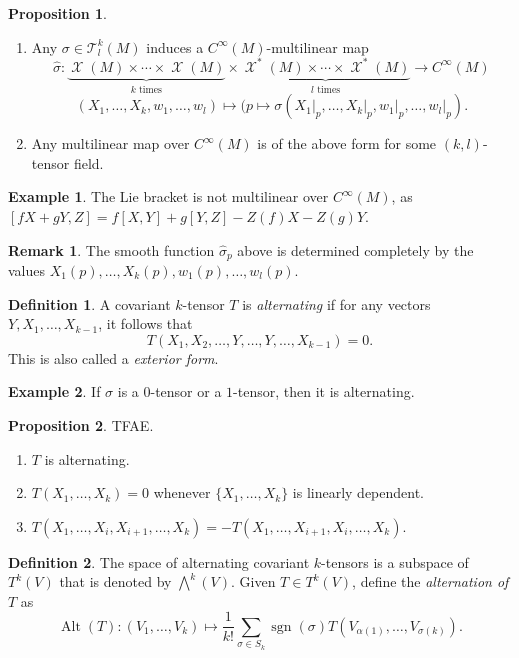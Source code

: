 \documentclass[10pt,letterpaper,cm]{nupset}
\theoremstyle{definition}
\newtheorem*{definition}{Definition}
\newtheorem{exmp}{Example}
\newtheorem{remark}{Remark}
\newtheorem{prop}{Proposition}
\newcommand{\T}{\mathcal T}
\newcommand{\1}{\mathbf{1}}
\newcommand{\0}{\vec 0}
\DeclareMathOperator{\Alt}{Alt}
\DeclareMathOperator{\sgn}{sgn}
\DeclareMathOperator{\vf}{\mathscr{X}}
\begin{document}
\begin{prop} $ $
\begin{enumerate}
\item Any $ \sigma \in \T_l^k(M)$ induces a $C^{\infty}(M)$-multilinear map $$\hat{\sigma} : \underbrace{\vf(M) \times \cdots \times \vf(M)}_{k \text{ times}} \times \underbrace{\vf^{\ast}(M) \times \cdots \times \vf^{\ast}(M)}_{l \text{ times}}\to C^{\infty}(M)$$  $$(X_1, \ldots, X_k, w_1, \ldots, w_l)\mapsto (p \mapsto \sigma (X_1\rvert_p, \ldots, X_k\rvert_p, w_1\rvert_p, \ldots, w_l\rvert_p).$$
\item Any multilinear map over $C^{\infty}(M)$ is of the above form for some $(k,l)$-tensor field.
\end{enumerate}
\end{prop}

\begin{exmp}
The Lie bracket is not multilinear over $C^{\infty}(M)$, as $[fX + gY, Z] = f[X, Y] + g[Y, Z]-Z(f)X -Z(g)Y$.
\end{exmp}

\begin{remark}
The smooth function $\hat{\sigma}_p$ above is determined completely by  the values $X_1(p), \ldots, X_k(p), w_1(p), \ldots, w_l(p)$.
\end{remark}

\begin{definition}
A covariant $k$-tensor $T$ is \textit{alternating}  if for any vectors $Y, X_1, \ldots, X_{k-1}$, it follows that $$T(X_1, X_2, \ldots, Y, \ldots, Y, \ldots, X_{k-1}) =0.$$ This is also called a \textit{exterior form}.
\end{definition}

\begin{exmp}
If $\sigma$ is a $0$-tensor or a $1$-tensor, then it is alternating.
\end{exmp}

\begin{prop} TFAE.
\begin{enumerate}
\item $T$ is alternating.
\item $T(X_1, \ldots, X_k) =0$ whenever $\{X_1, \ldots,  X_k\}$ is linearly dependent.
\item $T(X_1, \ldots, X_i, X_{i+1}, \ldots, X_k) = -T(X_1, \ldots, X_{i+1}, X_{i}, \ldots, X_k)$.
\end{enumerate}
\end{prop}

\begin{definition}
The space of alternating covariant $k$-tensors is a subspace of $T^k(V)$ that is denoted by $\bigwedge^k(V)$. Given $T\in T^k(V)$, define the \textit{alternation of $T$} as $$\Alt(T) : (V_1, \ldots, V_k) \mapsto \frac{1}{k!} \sum_{\sigma \in S_k} \sgn(\sigma) T(V_{\alpha(1)}, \ldots, V_{\sigma(k)}).$$
\end{definition}
\end{document}
